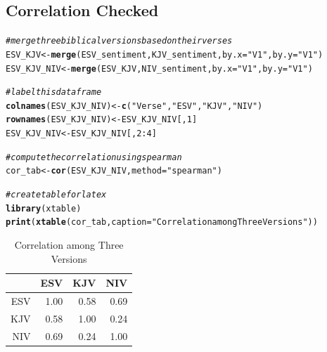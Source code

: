 \documentclass{article}\usepackage[]{graphicx}\usepackage[]{color}
\makeatletter
\newcommand{\hlnum}[1]{\textcolor[rgb]{0.686,0.059,0.569}{#1}}%
\newcommand{\hlstr}[1]{\textcolor[rgb]{0.192,0.494,0.8}{#1}}%
\newcommand{\hlcom}[1]{\textcolor[rgb]{0.678,0.584,0.686}{\textit{#1}}}%
\newcommand{\hlopt}[1]{\textcolor[rgb]{0,0,0}{#1}}%
\newcommand{\hlstd}[1]{\textcolor[rgb]{0.345,0.345,0.345}{#1}}%
\newcommand{\hlkwb}[1]{\textcolor[rgb]{0.69,0.353,0.396}{#1}}%
\newcommand{\hlkwc}[1]{\textcolor[rgb]{0.333,0.667,0.333}{#1}}%
\newcommand{\hlkwd}[1]{\textcolor[rgb]{0.737,0.353,0.396}{\textbf{#1}}}%
\newenvironment{kframe}{%
 \def\at@end@of@kframe{}%
 \ifinner\ifhmode%
  \def\at@end@of@kframe{\end{minipage}}%
  \begin{minipage}{\columnwidth}%
 \fi\fi%
 \def\FrameCommand##1{\hskip\@totalleftmargin \hskip-\fboxsep
 \colorbox{shadecolor}{##1}\hskip-\fboxsep
     \hskip-\linewidth \hskip-\@totalleftmargin \hskip\columnwidth}%
 \MakeFramed {\advance\hsize-\width
   \@totalleftmargin\z@ \linewidth\hsize
   \@setminipage}}%
 {\par\unskip\endMakeFramed%
 \at@end@of@kframe}
\makeatother
\begin{document}
\subsection{Correlation Checked}
\begin{kframe}
\begin{alltt}
\hlcom{# merge three biblical versions based on their verses}
\hlstd{ESV_KJV} \hlkwb{<-} \hlkwd{merge}\hlstd{(ESV_sentiment, KJV_sentiment,} \hlkwc{by.x} \hlstd{=} \hlstr{"V1"}\hlstd{,} \hlkwc{by.y} \hlstd{=} \hlstr{"V1"}\hlstd{)}
\hlstd{ESV_KJV_NIV} \hlkwb{<-} \hlkwd{merge}\hlstd{(ESV_KJV, NIV_sentiment,} \hlkwc{by.x} \hlstd{=} \hlstr{"V1"}\hlstd{,} \hlkwc{by.y} \hlstd{=} \hlstr{"V1"}\hlstd{)}

\hlcom{# label this dataframe}
\hlkwd{colnames}\hlstd{(ESV_KJV_NIV)} \hlkwb{<-} \hlkwd{c}\hlstd{(}\hlstr{"Verse"}\hlstd{,} \hlstr{"ESV"}\hlstd{,} \hlstr{"KJV"}\hlstd{,} \hlstr{"NIV"}\hlstd{)}
\hlkwd{rownames}\hlstd{(ESV_KJV_NIV)} \hlkwb{<-} \hlstd{ESV_KJV_NIV[,} \hlnum{1}\hlstd{]}
\hlstd{ESV_KJV_NIV} \hlkwb{<-} \hlstd{ESV_KJV_NIV[,} \hlnum{2}\hlopt{:}\hlnum{4}\hlstd{]}

\hlcom{# compute the correlation using spearman}
\hlstd{cor_tab} \hlkwb{<-} \hlkwd{cor}\hlstd{(ESV_KJV_NIV,} \hlkwc{method} \hlstd{=} \hlstr{"spearman"}\hlstd{)}

\hlcom{# create table for latex}
\hlkwd{library}\hlstd{(xtable)}
\hlkwd{print}\hlstd{(}\hlkwd{xtable}\hlstd{(cor_tab,} \hlkwc{caption} \hlstd{=} \hlstr{"Correlation among Three Versions"}\hlstd{))}
\end{alltt}
\end{kframe}%
\begin{table}[ht]
\centering
\begin{tabular}{rrrr}
  \hline
 & ESV & KJV & NIV \\ 
  \hline
ESV & 1.00 & 0.58 & 0.69 \\ 
  KJV & 0.58 & 1.00 & 0.24 \\ 
  NIV & 0.69 & 0.24 & 1.00 \\ 
   \hline
\end{tabular}
\caption{Correlation among Three Versions} 
\end{table}
\end{document}
